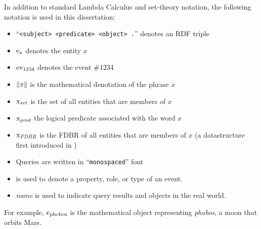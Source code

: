 \documentclass[../main.tex]{subfiles}
\begin{document}
\begin{refsection}
In addition to standard Lambda Calculus and set-theory notation, the following notation is used in this dissertation:
\begin{itemize}
    \item ``\texttt{<subject> <predicate> <object> .}'' denotes an RDF triple
    \item $\mathrm{e}_{\operatorname{x}}$ denotes the entity $x$
    \item $\operatorname{ev}_{1234}$ denotes the event \#1234
    \item $\lVert\textit{x\hspace{0.1em}}\rVert$ is the mathematical denotation of the phrase $x$
    \item $\operatorname{x}_{\operatorname{\mathit{set}}}$ is the set of all entities that are members of $x$
    \item $\operatorname{x}_{\operatorname{\mathit{pred}}}$ the logical predicate associated with the word $x$
    \item $\operatorname{x}_{\operatorname{\mathit{FDBR}}}$ is the FDBR of all entities that are members of $x$ (a datastructure first introduced in )
    \item Queries are written in ``\texttt{monospaced}'' font
    \item {} is used to denote a property, role, or type of an event.
    \item \textit{name} is used to indicate query results and objects in the real world.
\end{itemize}
For example, $\mathrm{e}_{\operatorname{phobos}}$ is the mathematical object representing \textit{phobos}, a moon that orbits Mars.


\printbibliography[heading=subbibintoc]
\end{refsection}
\end{document}
